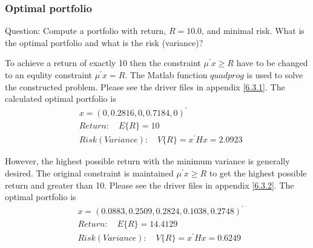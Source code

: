 \subsubsection{\bfseries Optimal
portfolio}
\begin{shaded}
{ Question: Compute a portfolio with return, $R = 10.0$, and minimal risk. What is the optimal portfolio and what is the risk (variance)?}
\end{shaded}
To achieve a return of exactly 10 then the constraint $\mu^{\prime}x\ge R$ have to be changed to an equlity constraint $\mu^{\prime}x= R$. The Matlab function $quadprog$ is used to solve the constructed problem. Please see the driver files in appendix \ref{6.3.1}. The calculated optimal portfolio is 
\begin{align*}
&    x=(0,0.2816,0,0.7184,0)^{\prime}\\
&Return: \quad E\{ R\}=10\\
&Risk(Variance):\quad V\{ R\}=x^{\prime}Hx=2.0923
\end{align*}

However, the highest possible return with the minimum variance is generally desired. The original constraint is maintained  $\mu^{\prime}x\ge R$ to get the highest possible return and greater than 10. Please see the driver files in appendix \ref{6.3.2}. The optimal portfolio is 
 \begin{align*}
&    x=(0.0883,0.2509,0.2824,0.1038,0.2748)^{\prime}\\
&Return: \quad E\{ R\}=14.4129\\
&Risk(Variance):\quad V\{ R\}=x^{\prime}Hx=0.6249
\end{align*}
